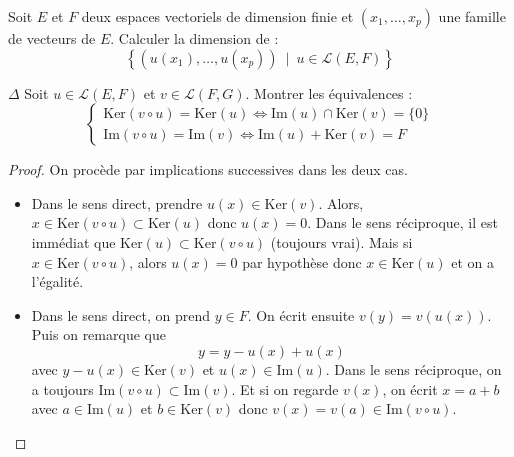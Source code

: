 \documentclass[french,a4paper]{article}
\renewcommand{\ker}{\text{Ker}}
\theoremstyle{plain}
\theoremstyle{definition}
\theoremstyle{remark}
\begin{document}
\begin{ex}[Moulin.EV.34]{}
	Soit $E$ et $F$ deux espaces vectoriels de dimension finie et $(x_1,\ldots,x_p)$ une famille de vecteurs de $E$. Calculer la dimension de : $$\left\{(u(x_1),\ldots,u(x_p))\ \mid\ u\in\mathcal{L}(E,F)\right\}$$
\end{ex}

\begin{ex}[Moulin.EV.35]{$\Delta$}
	Soit $u\in\mathcal{L}(E,F)$ et $v\in\mathcal{L}(F,G)$. Montrer les équivalences : $$\begin{cases}
		\ker(v\circ u)=\ker(u)\iff\text{Im}(u)\cap\ker(v)=\{0\} \\
		\text{Im}(v\circ u)=\text{Im}(v)\iff \text{Im}(u)+\ker(v)=F
	\end{cases}$$
\end{ex}
\begin{proof}
	On procède par implications successives dans les deux cas.
	\begin{itemize}
		\item Dans le sens direct, prendre $u(x)\in\ker(v)$. Alors, $x\in\ker(v\circ u)\subset\ker(u)$ donc $u(x)=0$. Dans le sens réciproque, il est immédiat que $\ker(u)\subset\ker(v\circ u)$ (toujours vrai). Mais si $x\in\ker(v\circ u)$, alors $u(x)=0$ par hypothèse donc $x\in\ker(u)$ et on a l'égalité.
		\item Dans le sens direct, on prend $y\in F$. On écrit ensuite $v(y)=v(u(x))$. Puis on remarque que $$y=y-u(x)+u(x)$$ avec $y-u(x)\in\ker(v)$ et $u(x)\in\text{Im}(u)$. Dans le sens réciproque, on a toujours $\text{Im}(v\circ u)\subset\text{Im}(v)$. Et si on regarde $v(x)$, on écrit $x=a+b$ avec $a\in\text{Im}(u)$ et $b\in\ker(v)$ donc $v(x)=v(a)\in\text{Im}(v\circ u)$.
	\end{itemize}
\end{proof}
\end{document}
